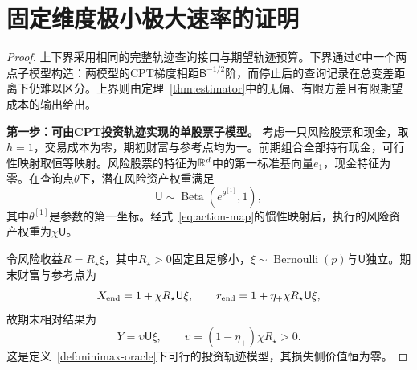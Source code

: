\section{固定维度极小极大速率的证明}\label{app:minimax}

\begin{proof}
上下界采用相同的完整轨迹查询接口与期望轨迹预算。下界通过$\mathfrak C$中一个两点子模型构造：两模型的CPT梯度相距$\mathsf B^{-1/2}$阶，而停止后的查询记录在总变差距离下仍难以区分。上界则由定理~\ref{thm:estimator}中的无偏、有限方差且有限期望成本的输出给出。

\par\smallskip\noindent\textbf{第一步：可由CPT投资轨迹实现的单股票子模型。}\quad
考虑一只风险股票和现金，取$h=1$，交易成本为零，期初财富与参考点均为一。前期组合全部持有现金，可行性映射取恒等映射。风险股票的特征为$\mathbb R^d$中的第一标准基向量$e_1$，现金特征为零。在查询点$\theta$下，潜在风险资产权重满足
\[
 \mathsf U\sim\operatorname{Beta}(e^{\theta^{[1]}},1),
\]
其中$\theta^{[1]}$是参数的第一坐标。经式~\eqref{eq:action-map}的惯性映射后，执行的风险资产权重为$\chi\mathsf U$。

令风险收益$R=R_\star\xi$，其中$R_\star>0$固定且足够小，$\xi\sim\operatorname{Bernoulli}(p)$与$\mathsf U$独立。期末财富与参考点为
\[
 X_{\rm end}=1+\chi R_\star\mathsf U\xi,
 \qquad
 r_{\rm end}=1+\eta_+\chi R_\star\mathsf U\xi,
\]
故期末相对结果为
\begin{equation}\label{eq:minimax-relative-outcome}
 Y=\upsilon\mathsf U\xi,
 \qquad
 \upsilon=(1-\eta_+)\chi R_\star>0.
\end{equation}
这是定义~\ref{def:minimax-oracle}下可行的投资轨迹模型，其损失侧价值恒为零。


\end{proof}
